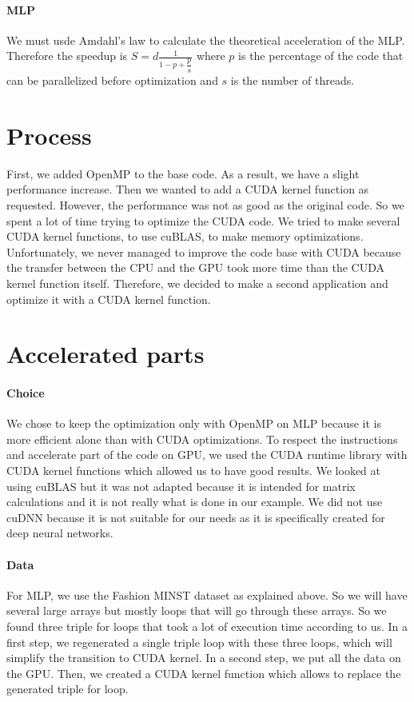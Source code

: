 \documentclass[11pt]{article}
\begin{document}
\paragraph*{MLP} We must usde Amdahl's law to calculate the theoretical acceleration of the MLP.
Therefore the speedup is $S = d\frac{1}{1 - p + \dfrac{p}{s}}$
where $p$ is the percentage of the code that can be parallelized before optimization and $s$ is the number of threads.

\pagebreak
{}

\section{Process}
First, we added OpenMP to the base code. As a result, we have a slight performance increase.
Then we wanted to add a CUDA kernel function as requested.
However, the performance was not as good as the original code.
So we spent a lot of time trying to optimize the CUDA code.
We tried to make several CUDA kernel functions, to use cuBLAS, to make memory optimizations.
Unfortunately, we never managed to improve the code base with CUDA
because the transfer between the CPU and the GPU took more time than the CUDA kernel function itself.
Therefore, we decided to make a second application and optimize it with a CUDA kernel function.

\section{Accelerated parts}

\paragraph*{Choice}
We chose to keep the optimization only with OpenMP on MLP because it is more efficient alone than with CUDA optimizations.
To respect the instructions and accelerate part of the code on GPU, we used the CUDA runtime library with CUDA kernel functions which allowed us to have good results.
We looked at using cuBLAS but it was not adapted because it is intended for matrix calculations and it is not really what is done in our example.
We did not use cuDNN because it is not suitable for our needs as it is specifically created for deep neural networks.

\paragraph*{Data} For MLP, we use the Fashion MINST dataset as explained above.
So we will have several large arrays but mostly loops that will go through these arrays.
So we found three triple for loops that took a lot of execution time according to us.
In a first step, we regenerated a single triple loop with these three loops, which will simplify the transition to CUDA kernel. In a second step, we put all the data on the GPU.
Then, we created a CUDA kernel function which allows to replace the generated triple for loop.
\end{document}
